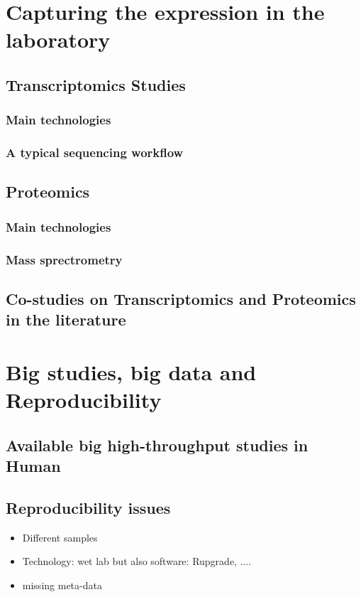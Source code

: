 \section{Capturing the expression in the laboratory}
\subsection{Transcriptomics Studies}
    \subsubsection{Main technologies}
    \subsubsection{A typical sequencing workflow}
\subsection{Proteomics}
    \subsubsection{Main technologies}
    \subsubsection{Mass sprectrometry}
\subsection{Co-studies on Transcriptomics and Proteomics in the literature}

\section{Big studies, big data and Reproducibility}
    \subsection{Available big high-throughput studies in Human}
    \subsection{Reproducibility issues}
        \begin{itemize}
            \item{Different samples}
            \item{Technology: wet lab but also software: Rupgrade, ....}
            \item{missing meta-data}
        \end{itemize}
